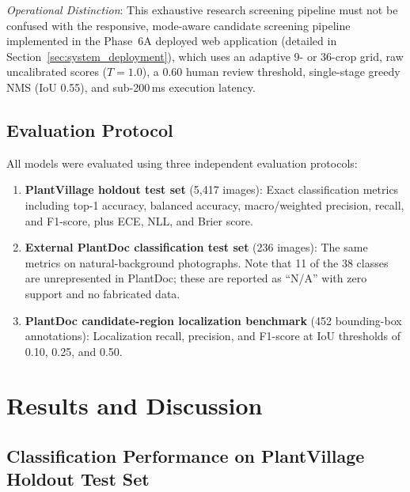 \documentclass[pdflatex,sn-mathphys-num]{sn-jnl}
\theoremstyle{thmstyleone}%
\theoremstyle{thmstyletwo}%
\theoremstyle{thmstylethree}%
\begin{document}
\textit{Operational Distinction}: This exhaustive research screening pipeline must not be confused with the responsive, mode-aware candidate screening pipeline implemented in the Phase~6A deployed web application (detailed in Section~\ref{sec:system_deployment}), which uses an adaptive 9- or 36-crop grid, raw uncalibrated scores ($T=1.0$), a 0.60 human review threshold, single-stage greedy NMS (IoU 0.55), and sub-200\,ms execution latency.

\subsection{Evaluation Protocol}
\label{sec:eval_protocol}

All models were evaluated using three independent evaluation protocols:

\begin{enumerate}
  \item \textbf{PlantVillage holdout test set} (5{,}417 images): Exact classification
        metrics including top-1 accuracy, balanced accuracy, macro/weighted precision,
        recall, and F1-score, plus ECE, NLL, and Brier score.
  \item \textbf{External PlantDoc classification test set} (236 images): The same
        metrics on natural-background photographs. Note that 11 of the 38 classes are
        unrepresented in PlantDoc; these are reported as ``N/A'' with zero support and
        no fabricated data.
  \item \textbf{PlantDoc candidate-region localization benchmark} (452 bounding-box
        annotations): Localization recall, precision, and F1-score at IoU thresholds
        of 0.10, 0.25, and 0.50.
\end{enumerate}


\section{Results and Discussion}
\label{sec:results}

\subsection{Classification Performance on PlantVillage Holdout Test Set}
\label{sec:results_plantvillage}
\end{document}
